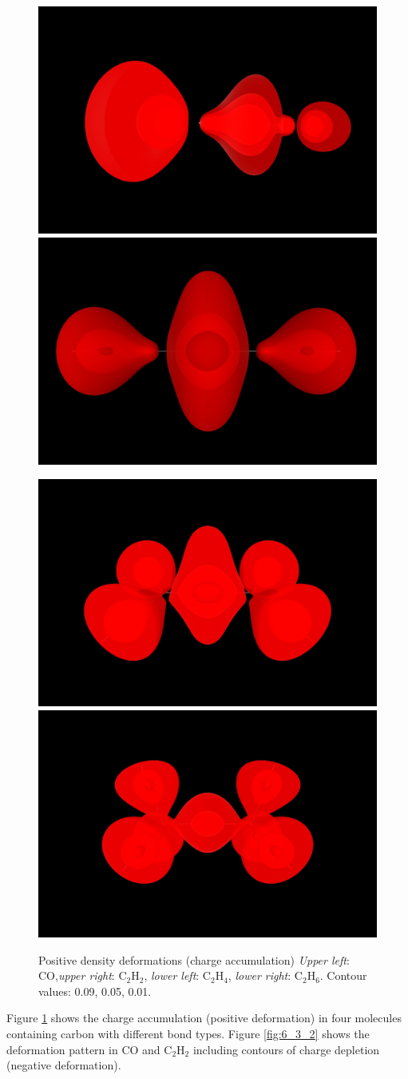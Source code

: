 \documentclass[10pt]{article}
\begin{document}
\vspace*{-2mm}
\begin{figure}[H]
\begin{center}
\includegraphics[width=.3\linewidth]{CO-def.jpg}
\hspace*{5mm}
\includegraphics[width=.3\linewidth]{C2H2-def.png}

\includegraphics[width=.3\linewidth]{C2H4-def.png}
\hspace*{5mm}
\includegraphics[width=.3\linewidth]{C2H6-def.png}
\end{center}
\caption[Positive density deformations (charge accumulation)]{ Positive density deformations (charge accumulation) 
{\it Upper left}: CO,{\it upper right}: C$_2$H$_2$, 
{\it lower left}: C$_2$H$_4$, {\it lower right}: C$_2$H$_6$.
Contour values: 0.09, 0.05, 0.01.
\label{fig:6_3_1}}
\end{figure}

Figure \ref{fig:6_3_1} shows the charge accumulation (positive deformation) in
four molecules containing carbon with different bond types. Figure
\ref{fig:6_3_2}
shows the deformation pattern in CO and C$_2$H$_2$ including contours
of charge depletion (negative deformation).
\end{document}
